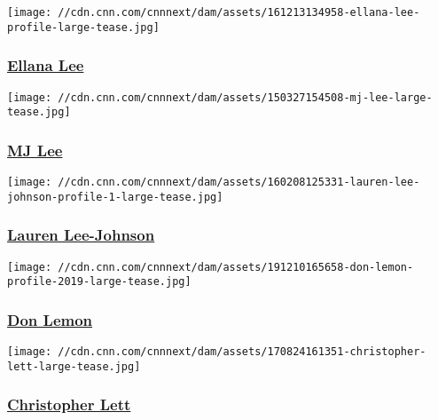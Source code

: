 \href{/profiles/ellana-lee-profile}{}

\texttt{[image: //cdn.cnn.com/cnnnext/dam/assets/161213134958-ellana-lee-profile-large-tease.jpg]}

\hypertarget{ellana-lee}{%
\subsubsection{\texorpdfstring{\href{/profiles/ellana-lee-profile}{Ellana
Lee}}{Ellana Lee}}\label{ellana-lee}}

\href{/profiles/mj-lee}{}

\texttt{[image: //cdn.cnn.com/cnnnext/dam/assets/150327154508-mj-lee-large-tease.jpg]}

\hypertarget{mj-lee}{%
\subsubsection{\texorpdfstring{\href{/profiles/mj-lee}{MJ
Lee}}{MJ Lee}}\label{mj-lee}}

\href{/profiles/lauren-lee-johnson}{}

\texttt{[image: //cdn.cnn.com/cnnnext/dam/assets/160208125331-lauren-lee-johnson-profile-1-large-tease.jpg]}

\hypertarget{lauren-lee-johnson}{%
\subsubsection{\texorpdfstring{\href{/profiles/lauren-lee-johnson}{Lauren
Lee-Johnson}}{Lauren Lee-Johnson}}\label{lauren-lee-johnson}}

\href{/profiles/don-lemon-profile}{}

\texttt{[image: //cdn.cnn.com/cnnnext/dam/assets/191210165658-don-lemon-profile-2019-large-tease.jpg]}

\hypertarget{don-lemon}{%
\subsubsection{\texorpdfstring{\href{/profiles/don-lemon-profile}{Don
Lemon}}{Don Lemon}}\label{don-lemon}}

\href{/profiles/christopher-lett}{}

\texttt{[image: //cdn.cnn.com/cnnnext/dam/assets/170824161351-christopher-lett-large-tease.jpg]}

\hypertarget{christopher-lett}{%
\subsubsection{\texorpdfstring{\href{/profiles/christopher-lett}{Christopher
Lett}}{Christopher Lett}}\label{christopher-lett}}

